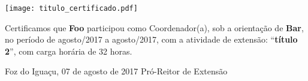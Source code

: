 \documentclass[a4paper,brazil]{article}%
\begin{document}
%
\normalsize%

\pagestyle{empty}
\BgThispage
%
\vspace*{2cm}%
\begin{flushright}%
\texttt{[image: titulo\_certificado.pdf]}%
\linebreak%
\end{flushright}%
\vspace*{-1cm}%
\Large%
%


    Certificamos que \textbf{Foo} participou como Coordenador(a), sob a orientação de \textbf{Bar}, no período de agosto/2017 a agosto/2017, com a atividade de extensão: ``\textbf{título 2}'', com carga horária de 32 horas.

\vspace*{1.5cm}%
\hspace*{7cm}%
\begin{minipage}{\widthof{Foz do Iguaçu, 07 de agosto de 2017}}%
\begin{center}%
Foz do Iguaçu, 07 de agosto de 2017%
\newline%
\newline%
\newline%
Pró{-}Reitor de Extensão%
\end{center}%
\end{minipage}%
\end{document}

